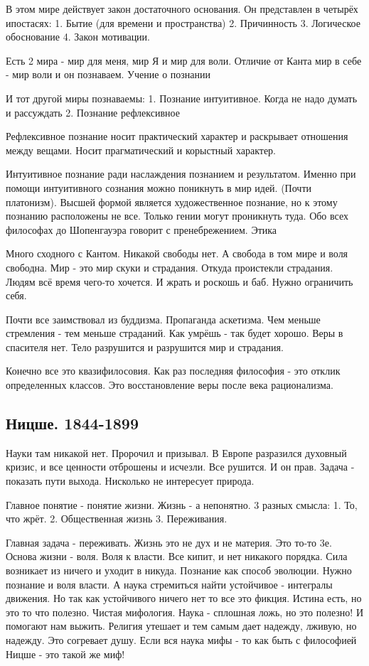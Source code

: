     В этом мире действует закон достаточного основания. Он представлен в четырёх ипостасях: 1. Бытие (для времени и пространства) 2. Причинность 3. Логическое обоснование 4. Закон мотивации.

Есть 2 мира - мир для меня, мир Я и мир для воли. Отличие от Канта мир в себе - мир воли и он познаваем.
Учение о познании

    И тот другой миры познаваемы: 1. Познание интуитивное. Когда не надо думать и рассуждать 2. Познание рефлексивное

Рефлексивное познание носит практический характер и раскрывает отношения между вещами. Носит прагматический и корыстный характер.

Интуитивное познание ради наслаждения познанием и результатом. Именно при помощи интуитивного сознания можно поникнуть в мир идей. (Почти платонизм). Высшей формой является художественное познание, но к этому познанию расположены не все. Только гении могут проникнуть туда. Обо всех философах до Шопенгауэра говорит с пренебрежением.
Этика

Много сходного с Кантом. Никакой свободы нет. А свобода в том мире и воля свободна. Мир - это мир скуки и страдания. Откуда проистекли страдания. Людям всё время чего-то хочется. И жрать и роскошь и баб. Нужно ограничить себя.

Почти все заимствовал из буддизма. Пропаганда аскетизма. Чем меньше стремления - тем меньше страданий. Как умрёшь - так будет хорошо. Веры в спасителя нет. Тело разрушится и разрушится мир и страдания.

Конечно все это квазифилосовия. Как раз последняя философия - это отклик определенных классов. Это восстановление веры после века рационализма.

\subsection{Ницше. 1844-1899}

Науки там никакой нет. Пророчил и призывал. В Европе разразился духовный кризис, и все ценности отброшены и исчезли. Все рушится. И он прав. Задача - показать пути выхода. Нисколько не интересует природа.

    Главное понятие - понятие жизни. Жизнь - а непонятно. 3 разных смысла: 1. То, что жрёт. 2. Общественная жизнь 3. Переживания.

Главная задача - переживать. Жизнь это не дух и не материя. Это то-то 3е. Основа жизни - воля. Воля к власти. Все кипит, и нет никакого порядка. Сила возникает из ничего и уходит в никуда. Познание как способ эволюции. Нужно познание и воля власти. А наука стремиться найти устойчивое - интегралы движения. Но так как устойчивого ничего нет то все это фикция. Истина есть, но это то что полезно. Чистая мифология. Наука - сплошная ложь, но это полезно! И помогают нам выжить. Религия утешает и тем самым дает надежду, лживую, но надежду. Это согревает душу. Если вся наука мифы - то как быть с философией Ницше - это такой же миф!

